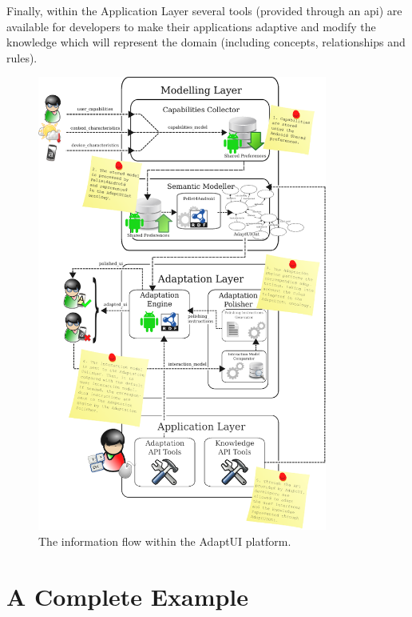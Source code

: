 Finally, within the Application Layer several tools (provided through an \ac{api})
are available for developers to make their applications adaptive and modify the
knowledge which will represent the domain (including concepts, relationships and
rules).

\begin{figure}
\centering
\includegraphics[width=0.85\textwidth]{architecture_flow.pdf}
\caption{The information flow within the AdaptUI platform.}
\label{fig:architecture_flow}
\end{figure}



\section{A Complete Example}
\label{sec:complete_example}

